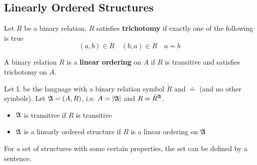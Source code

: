\subsection{Linearly Ordered Structures}

\begin{definition}[Trichotomy]
    Let $R$ be a binary relation, $R$ satisfies \textbf{trichotomy} if exactly one of the following is true
    \[ (a,b) \in R \quad (b,a) \in R \quad a = b \]
\end{definition}

\begin{definition}
    A binary relation $R$ is a \textbf{linear ordering} on $A$ if $R$ is transitive and satisfies trichotomy on $A$.
\end{definition}

\begin{definition}
    Let $\mathbb{L}$ be the language with a binary relation symbol $\dot{R}$ and $\doteq$ (and no other symbols). Let $\mathfrak{A} = (A,R)$, i.e. $A=|\mathfrak{A}|$ and $R = \dot{R}^{\mathfrak{A}}$.
    \begin{itemize}
        \item $\mathfrak{A}$ is transitive if $R$ is transitive
        \item $\mathfrak{A}$ is a linearly ordered structure if $R$ is a linear ordering on $\mathfrak{A}$
    \end{itemize}
\end{definition}

For a set of structures with some certain properties, the set can be defined by a sentence.

